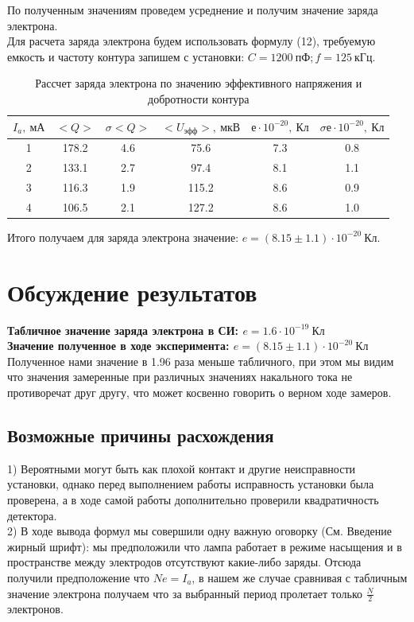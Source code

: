 \documentclass[a4paper, 12pt]{article}%
\begin{document}
	По полученным значениям проведем усреднение и получим значение заряда электрона.\\
	Для расчета заряда электрона будем использовать формулу (12), требуемую емкость и частоту контура запишем с установки: $C = 1200 ~пФ; f = 125~кГц$.\\
	\begin{table}[H]
		\centering
		\begin{tabular}{|c|c|c|c|c|c|}
			\hline
			$I_a,~ мА$ & $<Q>$ & $\sigma <Q>$& $<U_{эфф}>,~мкВ$  & $е \cdot 10^{-20}, ~Кл$   & $\sigma  е\cdot 10^{-20}, ~Кл$ \\ \hline
			1      & 178.2  & 4.6     & 75.6  & 7.3 & 0.8     \\ \hline
			2      & 133.1  & 2.7     & 97.4  & 8.1 & 1.1     \\ \hline
			3      & 116.3  & 1.9     & 115.2 & 8.6 & 0.9     \\ \hline
			4      & 106.5  & 2.1     & 127.2 & 8.6 & 1.0     \\ \hline
		\end{tabular}
		\caption{Рассчет заряда электрона по значению эффективного напряжения и добротности контура}
	\end{table}
	Итого получаем для заряда электрона значение: $e = (8.15\pm 1.1) \cdot 10^{-20}~Кл$.
	\newpage
	\section{Обсуждение результатов}
	\textbf{Табличное значение заряда электрона в СИ: $e = 1.6 \cdot 10^{-19}~Кл$\\
	Значение полученное в ходе эксперимента:  $e = (8.15\pm 1.1) \cdot 10^{-20}~Кл$\\}
	Полученное нами значение в 1.96 раза меньше табличного, при этом мы видим что значения замеренные при различных значениях накального тока не противоречат друг другу, что может косвенно говорить о верном ходе замеров.
	\subsection*{Возможные причины расхождения}
	1) Вероятными могут быть как плохой контакт и другие неисправности установки, однако перед выполнением работы исправность установки была проверена, а в ходе самой работы дополнительно проверили квадратичность детектора.\\
	2) В ходе вывода формул мы совершили одну важную оговорку (См. Введение жирный шрифт): мы предположили что лампа работает в режиме насыщения и в пространстве между электродов отсутствуют какие-либо заряды. Отсюда получили предположение что $Ne = I_a$, в нашем же случае сравнивая с табличным значение электрона получаем что за выбранный период пролетает только $\frac{N}{2}$ электронов.\\
\end{document}
